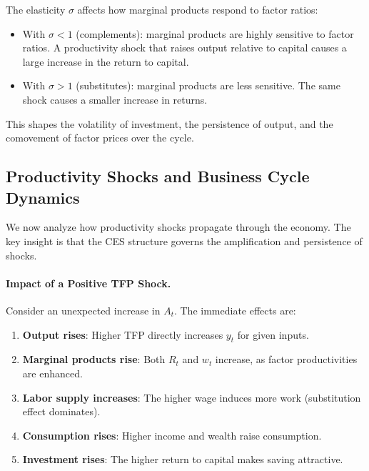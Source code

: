 \begin{calloutnote}
The elasticity $\sigma$ affects how marginal products respond to factor ratios:
\begin{itemize}[nosep]
\item With $\sigma < 1$ (complements): marginal products are highly sensitive to factor ratios. A productivity shock that raises output relative to capital causes a large increase in the return to capital.
\item With $\sigma > 1$ (substitutes): marginal products are less sensitive. The same shock causes a smaller increase in returns.
\end{itemize}
This shapes the volatility of investment, the persistence of output, and the comovement of factor prices over the cycle.
\end{calloutnote}

\subsection{Productivity Shocks and Business Cycle Dynamics}
\label{subsec:rbc-dynamics}

We now analyze how productivity shocks propagate through the economy. The key insight is that the CES structure governs the amplification and persistence of shocks.

\paragraph{Impact of a Positive TFP Shock.}
Consider an unexpected increase in $A_t$. The immediate effects are:

\begin{enumerate}[nosep]
\item \textbf{Output rises}: Higher TFP directly increases $y_t$ for given inputs.
\item \textbf{Marginal products rise}: Both $R_t$ and $w_t$ increase, as factor productivities are enhanced.
\item \textbf{Labor supply increases}: The higher wage induces more work (substitution effect dominates).
\item \textbf{Consumption rises}: Higher income and wealth raise consumption.
\item \textbf{Investment rises}: The higher return to capital makes saving attractive.
\end{enumerate}

